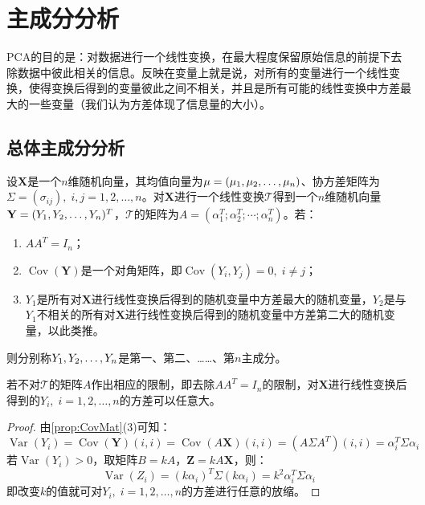 \section{主成分分析}

\gls{PCA}的目的是：对数据进行一个线性变换，在最大程度保留原始信息的前提下去除数据中彼此相关的信息。反映在变量上就是说，对所有的变量进行一个线性变换，使得变换后得到的变量彼此之间不相关，并且是所有可能的线性变换中方差最大的一些变量（我们认为方差体现了信息量的大小）。

\subsection{总体主成分分析}
\begin{definition}
	设$\mathbf{X}$是一个$n$维随机向量，其均值向量为$\mu=(\mu_1, \mu_2, \dots, \mu_{n})$、协方差矩阵为$\Sigma=(\sigma_{ij}),\;i,j=1,2,\dots,n$。对$\mathbf{X}$进行一个线性变换$\mathcal{T}$得到一个$n$维随机向量$\mathbf{Y}=(Y_1, Y_2, \dots, Y_{n})^T$，$\mathcal{T}$的矩阵为$A=(\alpha_1^T;\alpha_2^T;\cdots;\alpha_n^T)$。若：
	\begin{enumerate}
		\item $AA^T=I_n$；
		\item $\operatorname{Cov}(\mathbf{Y})$是一个对角矩阵，即$\operatorname{Cov}(Y_i,Y_j)=0,\;i\ne j$；
		\item $Y_1$是所有对$\mathbf{X}$进行线性变换后得到的随机变量中方差最大的随机变量，$Y_2$是与$Y_1$不相关的所有对$\mathbf{X}$进行线性变换后得到的随机变量中方差第二大的随机变量，以此类推。
	\end{enumerate}
	则分别称$Y_1, Y_2, \dots, Y_{n}$是第一、第二、……、第$n$主成分。
\end{definition}
\begin{theorem}
	若不对$\mathcal{T}$的矩阵$A$作出相应的限制，即去除$AA^T=I_n$的限制，对$\mathbf{X}$进行线性变换后得到的$Y_i,\;i=1,2,\dots,n$的方差可以任意大。
\end{theorem}
\begin{proof}
	由\cref{prop:CovMat}(3)可知：
	\begin{equation*}
		\operatorname{Var}(Y_i)=\operatorname{Cov}(\mathbf{Y})(i,i)=\operatorname{Cov}(A\mathbf{X})(i,i)=(A\Sigma A^T)(i,i)=\alpha_i^T\Sigma\alpha_i
	\end{equation*}
	若$\operatorname{Var}(Y_i)>0$，取矩阵$B=kA$，$\mathbf{Z}=kA\mathbf{X}$，则：
	\begin{equation*}
		\operatorname{Var}(Z_i)=(k\alpha_i)^T\Sigma(k\alpha_i)=k^2\alpha_i^T\Sigma\alpha_i
	\end{equation*}
	即改变$k$的值就可对$Y_i,\;i=1,2,\dots,n$的方差进行任意的放缩。
\end{proof}
